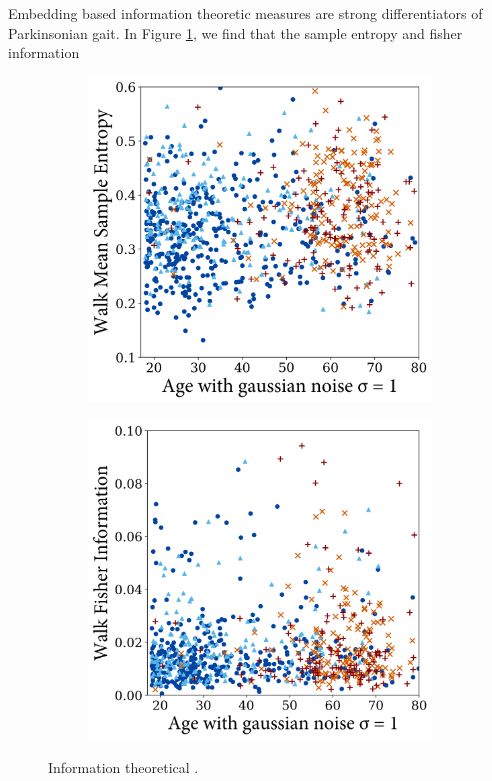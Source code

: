 \documentclass[12pt, twoside]{book}
\begin{document}
Embedding based information theoretic measures are strong differentiators of Parkinsonian gait. In Figure \ref{infodynamicwalk}, we find that the sample entropy and fisher information 


\begin{figure}[h]
	\centering
	\begin{subfigure}{.42\textwidth}
		\centering
		\includegraphics[width=0.96\linewidth]{walk_samp_ent.png}
	\end{subfigure}%
	\begin{subfigure}{.42\textwidth}
		\centering
		\includegraphics[width=0.96\linewidth]{walk_fisher.png}
	\end{subfigure}
	\caption{Information theoretical . }
	\label{infodynamicwalk}
\end{figure}
\end{document}

